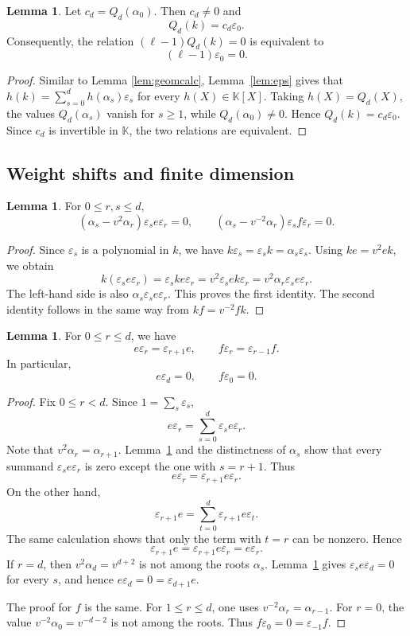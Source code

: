 \documentclass[12pt]{amsart}
\numberwithin{equation}{section}
\theoremstyle{definition}
\newtheorem{lemma}[theorem]{Lemma}
\theoremstyle{definition}
\newcommand{\kk}{\mathbb K}
\newcommand{\eps}{\varepsilon}
\begin{document}
\begin{lemma}\label{lem:boundary}
Let $c_d=Q_d(\alpha_0)$. Then $c_d\ne0$ and
$$
Q_d(k)=c_d\eps_0.
$$
Consequently, the relation $(\ell-1)Q_d(k)=0$ is equivalent to
$$
(\ell-1)\eps_0=0.
$$
\end{lemma}

\begin{proof}
Similar to Lemma \ref{lem:geomcalc}, Lemma~\ref{lem:eps} gives that $h(k)=\sum_{s=0}^{d}h(\alpha_s)\eps_s$ for every $h(X)\in\kk[X]$. 
Taking $h(X)=Q_d(X)$, the values $Q_d(\alpha_s)$ vanish for $s\ge1$, while $Q_d(\alpha_0)\ne0$. Hence $Q_d(k)=c_d\eps_0$. Since $c_d$ is invertible in $\kk$, the two relations are equivalent.
\end{proof}


\subsection{Weight shifts and finite dimension}\label{subsec:finite}

\begin{lemma}\label{lem:components}
For $0\le r,s\le d$,
$$
(\alpha_s-v^2\alpha_r)\eps_se\eps_r=0,
\qquad
(\alpha_s-v^{-2}\alpha_r)\eps_sf\eps_r=0.
$$
\end{lemma}

\begin{proof}
Since $\eps_s$ is a polynomial in $k$, we have $k\eps_s=\eps_sk=\alpha_s\eps_s$. Using $ke=v^2ek$, we obtain
$$
k(\eps_se\eps_r)=\eps_ske\eps_r
=v^2\eps_se k\eps_r=v^2\alpha_r\eps_se\eps_r.
$$
The left-hand side is also $\alpha_s\eps_se\eps_r$. This proves the first identity. 
The second identity follows in the same way from $kf=v^{-2}fk$.
\end{proof}

\begin{lemma}\label{lem:shift}
For $0\le r\le d$, we have
$$
e\eps_r=\eps_{r+1}e,
\qquad
f\eps_r=\eps_{r-1}f.
$$
In particular,
$$
e\eps_d=0,
\qquad
f\eps_0=0.
$$
\end{lemma}
\begin{proof}
Fix $0\le r<d$. Since $1=\sum_s\eps_s$,
$$
e\eps_r=\sum_{s=0}^{d}\eps_se\eps_r.
$$
Note that $v^2\alpha_r=\alpha_{r+1}$. Lemma~\ref{lem:components} and the distinctness of $\alpha_s$ show that every summand $\eps_se\eps_r$ is zero except the one with $s=r+1$. Thus
$$
e\eps_r=\eps_{r+1}e\eps_r.
$$
On the other hand,
$$
\eps_{r+1}e=\sum_{t=0}^{d}\eps_{r+1}e\eps_t.
$$
The same calculation shows that only the term with $t=r$ can be nonzero. Hence
$$
\eps_{r+1}e=\eps_{r+1}e\eps_r=e\eps_r.
$$
If $r=d$, then $v^2\alpha_d=v^{d+2}$ is not among the roots $\alpha_s$. Lemma~\ref{lem:components} gives $\eps_se\eps_d=0$ for every $s$, and hence $e\eps_d=0=\eps_{d+1}e$.

The proof for $f$ is the same. For $1\le r\le d$, one uses $v^{-2}\alpha_r=\alpha_{r-1}$. For $r=0$, the value $v^{-2}\alpha_0=v^{-d-2}$ is not among the roots. Thus $f\eps_0=0=\eps_{-1}f$.
\end{proof}
\end{document}
